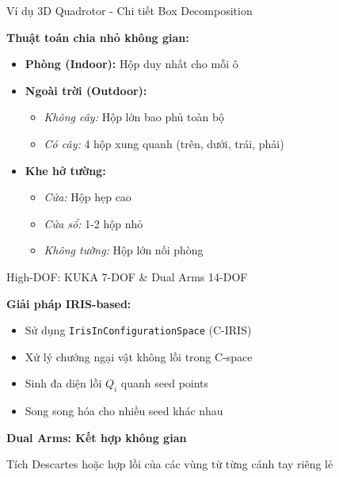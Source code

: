 \documentclass[aspectratio=169]{beamer}
\begin{document}
\begin{frame}{Ví dụ 3D Quadrotor - Chi tiết Box Decomposition}

    \textbf{Thuật toán chia nhỏ không gian:}
    \begin{itemize}
        \item \textbf{Phòng (Indoor):} Hộp duy nhất cho mỗi ô

        \item \textbf{Ngoài trời (Outdoor):}
              \begin{itemize}
                  \item \textit{Không cây:} Hộp lớn bao phủ toàn bộ
                  \item \textit{Có cây:} 4 hộp xung quanh (trên, dưới, trái, phải)
              \end{itemize}

        \item \textbf{Khe hở tường:}
              \begin{itemize}
                  \item \textit{Cửa:} Hộp hẹp cao
                  \item \textit{Cửa sổ:} 1-2 hộp nhỏ  
                  \item \textit{Không tường:} Hộp lớn nối phòng
              \end{itemize}
    \end{itemize}

\end{frame}

\begin{frame}{High-DOF: KUKA 7-DOF \& Dual Arms 14-DOF}

    \textbf{Giải pháp IRIS-based:}
    \begin{itemize}
        \item Sử dụng \texttt{IrisInConfigurationSpace} (C-IRIS)
        \item Xử lý chướng ngại vật không lồi trong C-space
        \item Sinh đa diện lồi $Q_i$ quanh seed points
        \item Song song hóa cho nhiều seed khác nhau
    \end{itemize}

    \vspace{1em}
    \textbf{Dual Arms: Kết hợp không gian}
    
    Tích Descartes hoặc hợp lồi của các vùng từ từng cánh tay riêng lẻ

\end{frame}
\end{document}

